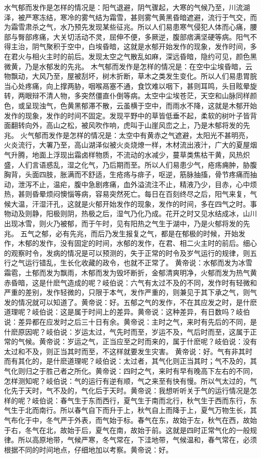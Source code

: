 \documentclass[a4paper,12pt,UTF8,twoside]{ctexbook}
\begin{document}
水气郁而发作是怎样的情况是：阳气退避，阴气骤起，大寒的气候乃至，川流湖泽，被严寒冻结，寒冷的雾气结为霜雪，甚则雾气黄黑昏暗遮避，流行于气交，而为霜雪肃杀之气，水乃预先发现某些征兆。所以人们易患寒气侵犯人体而心痛，腰部与臀部疼痛，大关切活动不灵，屈伸不便，多厥逆，腹部痞满坚硬等病。阳气不得主治，阴气聚积于空中，白埃昏暗，这就是水郁开始发作的现象，发作时间，多在君火与相火主时的前后。发现太空之气散乱如麻，深远昏暗，隐约可见，颜色黑微黄，乃是水郁发的先兆。
木气郁而发作是怎样的情况是：在空中尘埃昏暗，云物飘动，大风乃至，屋被刮坏，树木折断，草木之类发生变化。所以人们易患胃脘当心处疼痛，向上撑两胁，咽喉鬲塞不通，食饮难以咽下，甚则耳鸣，头目眩晕旋转，两眼辩不清人物，多突然僵直仆倒等病。太空中尘埃苍茫，天空和山脉同样颜色，或呈现浊气，色黄黑郁滞不散，云虽横于空中，而雨水不降，这就是木郁开始发作的现象，发作的时间不固定。发现平野中的草皆低垂不起，柔软的树叶子皆背面翻转向外，高山之松，被风吹作响，虎叫于山崖风峦之上，乃是木郁将发的先兆。
火气郁而发作是怎样的情况是：太空中有黄赤之气遮避，太阳光不甚明亮，火炎流行，大署乃至，高山湖泽似被火炎烧燎一样，木材流出液汁，广大的夏屋烟气升腾，地面上浮现出霜卤样物质，不流动的水减少，蔓草类焦枯干黄，风热炽盛，人们言语惑乱，湿之化气，乃后期而至。所以人们易患少气，疮疡痈肿，胁腹胸背，头面四肢，胀满而不舒适，生疮疡与痱子，呕逆，筋脉抽搐，骨节疼痛而抽动，泄泻不止，温疟，腹中急剧疼痛，血外溢流注不止，精液乃少，目赤，心中烦热，甚则昏晕烦闷懊惱等病，容易突然死亡。每日在百刻终尽之后，阳气来复，气候大温，汗湿汗孔，这就是火郁开始发作的现象，发作的时间，多在四气之时。事物动及则静，阳极则阴，热极之后，湿气乃化乃成。花开之时又见水结成冰，山川出现冰雪，则火乃被郁，而于午时，见有阳热之气生于湖中，乃是火郁将发的先兆。
五气之郁，必有先兆，而后乃发生报复之气，都是在郁极的时候，开始发作，木郁的发作，没有固定的时间，水郁的发作，在君、相二火主时的前后。细心的观察时令，发病的情况是可以预测的，失于正常的时令及岁气运行的规律，则五行之气运行错乱，生长化收藏的政令，也就不正常了。
黄帝说：水郁而发为冰雪霜雹，土郁而发为飘雨，木郁而发为毁坏断折，金郁清爽明净，火郁而发为热气黄赤昏暗，这是什麽气造成的呢？岐伯说：六气有太过不及的不同，发作时有轻微和严重的差别，发作轻微的，只限于本气，发作严重的，则兼见于其下承之气，则气发的情况就可以知道了。黄帝说：好。五郁之气的发作，不在其应发之时，是什麽道理呢？岐伯说：这是属于时间上的差异。黄帝说：这种差异，有日数吗？岐伯说：差异都在应发时之后三十日有余。黄帝说：主时之气，来时有先后的不同，是什麽原因呢？岐伯说：岁运太过，气先时而至，岁运不及，气后时而至，这属于正常的气候。黄帝说：岁运之气，正当应至之时而来的，属于什麽呢？岐伯说：没有太过和不及，则正当其时而至，不这样就要发生灾害。
黄帝说：好。气有非其时而有其化的，是什麽道理呢？岐伯说：太过者，其气化则正当其时；气不及的，其气化则归之于胜己者之所化。黄帝说：四时之气，来时有早有晚高下左右的不同，怎样测知呢？岐伯说：气的运行有逆有顺，气之来至有快有慢。所以气太过的，气化先于天时，气不及的，气化后于天时。黄帝说：我想听听关于气的运行情况是怎样的呢？岐伯说：春气生于东而西行，夏气生于南而北行，秋气生于西而东行，东气生于北而南行。所以春气自下而升于上，秋气自上而降于上，夏气万物生长，其气布化于中，冬气严于外表，而气始于标。春气在东，故始于左，秋气在西，故始于右，冬气在北，故始于后，夏气在南，故始于前。这就是四时正常气化的一般规律。所以高原地带，气候严寒，冬气常在，下洼地带，气候温和，春气常在，必须根据不同的时间地点，仔细地加以考察。黄帝说：好。
\end{document}
